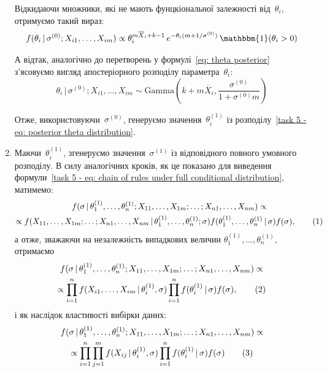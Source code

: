 \begin{enumerate}
        Відкидаючи множники, які не мають фунцкіональної залежності від~$\theta_i$, отримуємо такий вираз:
        \begin{align}
            f(\theta_i \,|\, \sigma^{(0)}; X_{i1},\ldots,X_{im}) \propto \theta_i^{m\overline{X}_i + k - 1}\, e^{-\theta_i(m + 1/\sigma^{(0)})}\, \mathbbm{1}(\theta_i>0)
        \end{align}

        А відтак, аналогічно до перетворень у формулі~\eqref{eq: theta posterior} з'ясовуємо вигляд апостеріорного розподілу параметра~$\theta_i:$
        \begin{equation}\label{task 5 - eq: posterior theta distribution}
            \theta_i \,|\, \sigma^{(0)}; X_{i1},\ldots,X_{im} \sim \mathrm{Gamma}\left( k+m\overline{X}_i,\frac{\sigma^{(0)}}{1+\sigma^{(0)}m} \right)
        \end{equation}

        Отже, використовуючи~$\sigma^{(0)}$, генеруємо значення~$\theta_i^{(1)}$ із розподілу~\eqref{task 5 - eq: posterior theta distribution}.

    \item Маючи~$\theta_i^{(1)}$, згенеруємо значення~$\sigma^{(1)}$ із відповідного повного умовного розподілу. В силу аналогічних кроків, як це показано для виведення формули~\eqref{task 5 - eq: chain of rules under full conditional distribution}, матимемо:
        \begin{multline*}
            f(\sigma \,|\, \theta_1^{(1)},\ldots,\theta_n^{(1)}; X_{11},\ldots,X_{1m};\ldots;X_{n1},\ldots,X_{nm}) \propto \\
            \propto f(X_{11},\ldots,X_{1m};\ldots;X_{n1},\ldots,X_{nm} \,|\, \theta_1^{(1)},\ldots,\theta_n^{(1)}; \sigma) f(\theta_1^{(1)},\ldots,\theta_n^{(1)} \,|\, \sigma) f(\sigma), \stepcounter{equation}\tag{\theequation}
        \end{multline*}
        а отже, зважаючи на незалежність випадкових величин $\theta_1^{(1)},\ldots,\theta_n^{(1)}$, отримаємо
        \begin{multline*}
            f(\sigma \,|\, \theta_1^{(1)},\ldots,\theta_n^{(1)}; X_{11},\ldots,X_{1m};\ldots;X_{n1},\ldots,X_{nm}) \propto \\
            \propto \prod_{i=1}^{n} f(X_{i1},\ldots,X_{im} \,|\, \theta_i^{(1)}, \sigma) \prod_{i=1}^{n} f(\theta_i^{(1)} \,|\, \sigma) f(\sigma), \stepcounter{equation}\tag{\theequation}
        \end{multline*}
        і як наслідок властивості вибірки даних:
        \begin{multline*}
            f(\sigma \,|\, \theta_1^{(1)},\ldots,\theta_n^{(1)}; X_{11},\ldots,X_{1m};\ldots;X_{n1},\ldots,X_{nm}) \propto \\
            \propto \prod_{i=1}^{n} \prod_{j=1}^{m} f(X_{ij} \,|\, \theta_i^{(1)}, \sigma) \prod_{i=1}^{n} f(\theta_i^{(1)} \,|\, \sigma) f(\sigma) \stepcounter{equation}\tag{\theequation}
        \end{multline*}


\end{enumerate}
